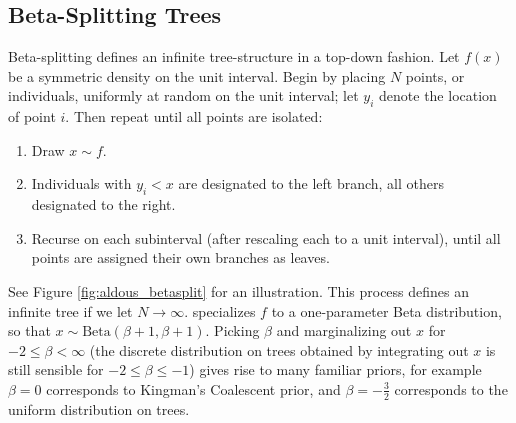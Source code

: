 \documentclass{bioinfo}
\newcommand{\Beta}{\mathrm{Beta} }
\newcommand{\Bernoulli}{\mathrm{Bernoulli} }
\begin{document}
\begin{methods}
\section{Beta-Splitting Trees}
\label{sec:beta_splitting}
Beta-splitting defines an infinite tree-structure in a top-down fashion.  Let $f(x)$ be a symmetric density on the unit interval.  Begin by placing $N$ points, or individuals, uniformly at random on the unit interval; let $y_i$ denote the location of point $i$.  Then repeat until all points are isolated:
\begin{enumerate}
\item Draw $x \sim f$.
\item Individuals with $y_i < x$ are designated to the left branch, all others designated to the right. 
\item Recurse on each subinterval (after rescaling each to a unit interval), until all points are assigned their own branches as leaves. 
\end{enumerate}
See Figure \ref{fig:aldous_betasplit} for an illustration.  This process defines an infinite tree if we let $N\rightarrow \infty$.  \cite{Aldous1995} specializes $f$ to a one-parameter Beta distribution, so that $x \sim \Beta(\beta+1,\beta+1)$. Picking $\beta$ and marginalizing out $x$ for $-2 \leq \beta < \infty$ (the discrete distribution on trees obtained by integrating out $x$ is still sensible for $-2 \leq \beta \leq -1$) gives rise to many familiar priors, for example $\beta=0$ corresponds to Kingman's Coalescent prior, and $\beta=-\frac{3}{2}$ corresponds to the uniform distribution on trees.





\end{methods}
\end{document}
